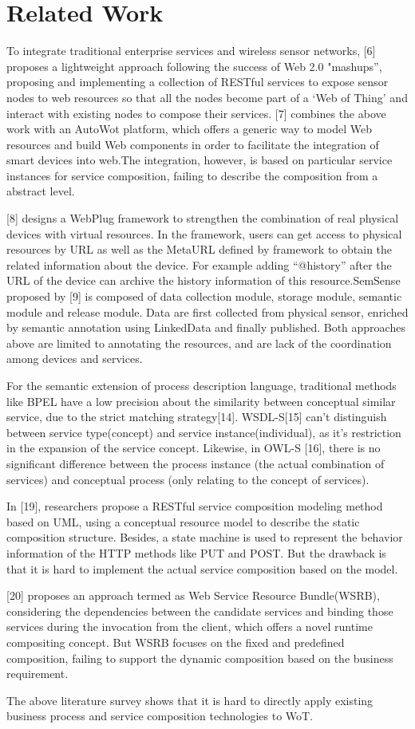 \section{Related Work}
\label{Related Work}
To integrate traditional enterprise services and wireless sensor networks, [6] proposes a lightweight approach following the success of Web 2.0 "mashups”, proposing and implementing a collection of RESTful services to expose sensor nodes to web resources so that all the nodes become part of a ‘Web of Thing’ and interact with existing nodes to compose their services. [7] combines the above work with an AutoWot platform, which offers a generic way to model Web resources and build Web components in order to facilitate the integration of smart devices into web.The integration, however, is based on particular service instances for service composition, failing to describe the composition from a abstract level. 

[8] designs a WebPlug framework to strengthen the combination of real physical devices with virtual resources. In the framework, users can get access to physical resources by URL as well as the MetaURL defined by framework to obtain the related information about the device. For example adding “@history” after the URL of the device can archive the history information of this resource.SemSense proposed by [9] is composed of data collection module, storage module, semantic module and release module. Data are first collected from physical sensor, enriched by semantic annotation using LinkedData and finally published. Both approaches above are limited to annotating the resources, and are lack of the coordination among devices and services. 

For the semantic extension of process description language, traditional methods like BPEL have a low precision about the similarity between conceptual similar service, due to the strict matching strategy[14]. WSDL-S[15] can't distinguish between service type(concept) and service instance(individual), as it's restriction in the expansion of the service concept. Likewise, in OWL-S [16], there is no significant difference between the process instance (the actual combination of services) and conceptual process (only relating to the concept of services). 

In [19], researchers propose a RESTful service composition modeling method based on UML, using a conceptual resource model to describe the static composition structure. Besides, a state machine is used to represent the behavior information of the HTTP methods like PUT and POST. But the drawback is that it is hard to implement the actual service composition based on the model. 

[20] proposes an approach termed as Web Service Resource Bundle(WSRB), considering the dependencies between the candidate services and binding those services during the invocation from the client, which offers a novel runtime compositing concept. But WSRB focuses on the fixed and predefined composition, failing to support the dynamic composition based on the business requirement. 

The above literature survey shows that it is hard to directly apply existing business process and service composition technologies to WoT. 
